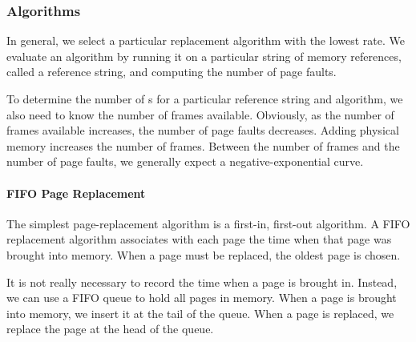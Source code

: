 \subsubsection{Algorithms}\label{subsubsec:Page_Replacement_Algorithms}
In general, we select a particular replacement algorithm with the lowest  rate.
We evaluate an algorithm by running it on a particular string of memory references, called a reference string, and computing the number of page faults.

To determine the number of s for a particular reference string and  algorithm, we also need to know the number of frames available.
Obviously, as the number of frames available increases, the number of page faults decreases.
Adding physical memory increases the number of frames.
Between the number of frames and the number of page faults, we generally expect a negative-exponential curve.

\paragraph{FIFO Page Replacement}\label{par:FIFO_Page_Replacement}
The simplest page-replacement algorithm is a first-in, first-out algorithm.
A FIFO replacement algorithm associates with each page the time when that page was brought into memory.
When a page must be replaced, the oldest page is chosen.

It is not really necessary to record the time when a page is brought in.
Instead, we can use a FIFO queue to hold all pages in memory.
When a page is brought into memory, we insert it at the tail of the queue.
When a page is replaced, we replace the page at the head of the queue.



